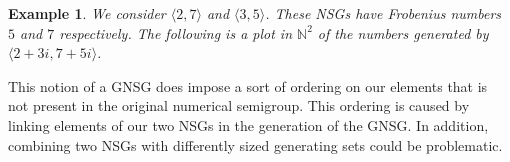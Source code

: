 \documentclass[11pt]{amsart}
\theoremstyle{plain}
\newtheorem{exa}{Example}
\theoremstyle{definition}
\begin{document}
\begin{exa}
We consider $\langle 2,7\rangle$ and $\langle 3,5\rangle$. These NSGs have Frobenius numbers $5$ and $7$ respectively\cite{frobmask}. The following is a plot in $\mathbb{N}^2$ of the numbers generated by $\langle 2+3i,7+5i\rangle$.

\begin{center}
\end{center}
\end{exa}
This notion of a GNSG does impose a sort of ordering on our elements that is not present in the original numerical semigroup. This ordering is caused by linking elements of our two NSGs in the generation of the GNSG. In addition, combining two NSGs with differently sized generating sets could be problematic.
\end{document}
